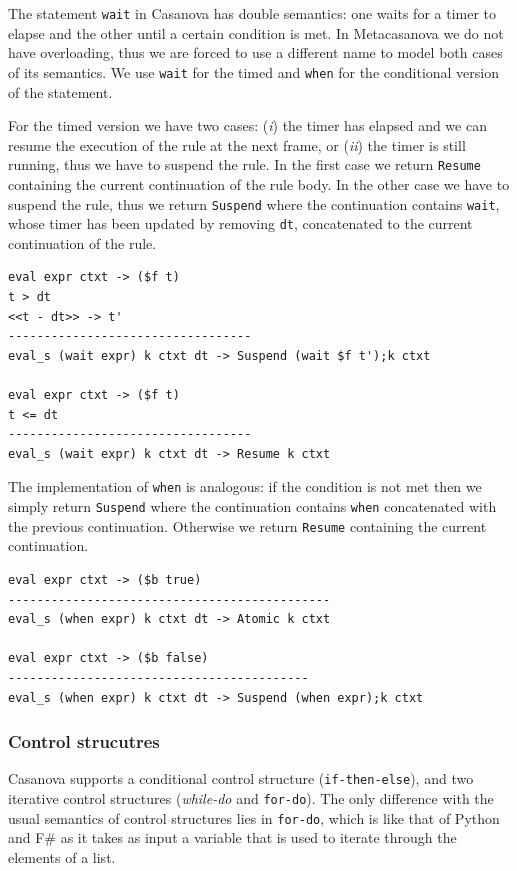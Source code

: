 \noindent
The statement \texttt{wait} in Casanova has double semantics: one waits for a timer to elapse and the other until a certain condition is met. In Metacasanova we do not have overloading, thus we are forced to use a different name to model both cases of its semantics. We use \texttt{wait} for the timed and \texttt{when} for the conditional version of the statement.

For the timed version we have two cases: (\textit{i}) the timer has elapsed and we can resume the execution of the rule at the next frame, or (\textit{ii}) the timer is still running, thus we have to suspend the rule. In the first case we return \texttt{Resume} containing the current continuation of the rule body. In the other case we have to suspend the rule, thus we return \texttt{Suspend} where the continuation contains \texttt{wait}, whose timer has been updated by removing \texttt{dt}, concatenated to the current continuation of the rule.

\begin{lstlisting}
eval expr ctxt -> ($f t)
t > dt
<<t - dt>> -> t'
----------------------------------
eval_s (wait expr) k ctxt dt -> Suspend (wait $f t');k ctxt

eval expr ctxt -> ($f t)
t <= dt
----------------------------------
eval_s (wait expr) k ctxt dt -> Resume k ctxt
\end{lstlisting}

\noindent
The implementation of \texttt{when} is analogous: if the condition is not met then we simply return \texttt{Suspend} where the continuation contains \texttt{when} concatenated with the previous continuation. Otherwise we return \texttt{Resume} containing the current continuation.

\begin{lstlisting}
eval expr ctxt -> ($b true)
---------------------------------------------
eval_s (when expr) k ctxt dt -> Atomic k ctxt

eval expr ctxt -> ($b false)
------------------------------------------
eval_s (when expr) k ctxt dt -> Suspend (when expr);k ctxt
\end{lstlisting}

\subsubsection{Control strucutres}
Casanova supports a conditional control structure (\texttt{if-then-else}), and two iterative control structures (\textit{while-do} and \texttt{for-do}). The only difference with the usual semantics of control structures lies in \texttt{for-do}, which is like that of Python and F\# as it takes as input a variable that is used to iterate through the elements of a list.

